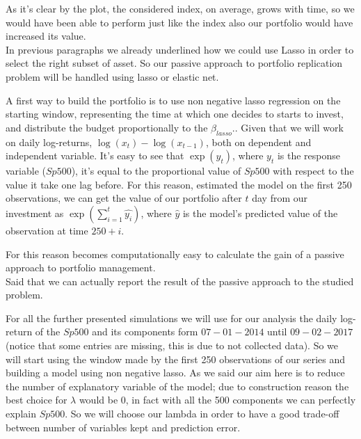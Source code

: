 \documentclass{article}%
\begin{document}
		
As it's clear by the plot, the considered index, on average, grows with time, so we would have been able to perform just like the index also our portfolio would have increased its value.
\\

In previous paragraphs we already underlined how we could use Lasso in order to select the right subset of asset. So our passive approach to portfolio replication problem will be handled using lasso or elastic net.

A first way to build the portfolio is to use non negative lasso regression on the starting window, representing the time at which one decides to starts to invest, and distribute the budget proportionally to the $\beta_{lasso}$.. Given that we will work on daily log-returns, $\log(x_t)-\log(x_{t-1})$, both on dependent and independent variable. It's easy to see that $\exp(y_t)$, where $y_t$ is the response variable ($Sp500$), it's equal to the proportional value of $Sp500$ with respect to the value it take one lag before. For this reason, estimated the model on the first 250 observations, we can get the value of our portfolio after $t$ day from our investment as $\exp(\sum_{i=1}^t \hat{y_i})$, where $\hat{y}$ is the model's predicted value of the observation at time $250+i$.

For this reason becomes computationally easy to calculate the gain of a passive approach to portfolio management. 
\\

Said that we can actually report the result of the passive approach to the studied problem.

For all the further presented simulations we will use for our analysis the daily log-return of the $Sp500$ and its components form $07-01-2014$ until $09-02-2017$ (notice that some entries are missing, this is due to not collected data). So we will start using the window made by the first 250 observations of our series and building a model using non negative lasso. As we said our aim here is to reduce the number of explanatory variable of the model; due to construction reason the best choice for $\lambda$ would be 0, in fact with all the 500 components we can perfectly explain $Sp500$. So we will choose our lambda in order to have a good trade-off between number of variables kept and prediction error. 
\\
\end{document}

